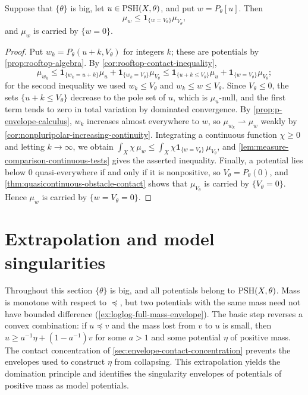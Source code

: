 \begin{proposition}\label{prop:p-envelope-contact-concentration}
Suppose that $\{\theta\}$ is big, let $u\in\mathrm{PSH}(X,\theta)$, and put $w=P_\theta[u]$. Then
\[
 \mu_w\leq\mathbf1_{\{w=V_\theta\}}\mu_{V_\theta},
\]
and $\mu_w$ is carried by $\{w=0\}$.
\end{proposition}
\begin{proof}
Put $w_k=P_\theta(u+k,V_\theta)$ for integers $k$; these are potentials by \cref{prop:rooftop-algebra}. By \cref{cor:rooftop-contact-inequality},
\[
 \mu_{w_k}\leq\mathbf1_{\{w_k=u+k\}}\mu_u+\mathbf1_{\{w_k=V_\theta\}}\mu_{V_\theta}
        \leq\mathbf1_{\{u+k\leq V_\theta\}}\mu_u
        +\mathbf1_{\{w=V_\theta\}}\mu_{V_\theta};
\]
for the second inequality we used $w_k\leq V_\theta$ and $w_k\leq w\leq V_\theta$. Since $V_\theta\leq0$, the sets $\{u+k\leq V_\theta\}$ decrease to the pole set of $u$, which is $\mu_u$-null, and the first term tends to zero in total variation by dominated convergence. By \cref{prop:p-envelope-calculus}, $w_k$ increases almost everywhere to $w$, so $\mu_{w_k}\rightharpoonup\mu_w$ weakly by \cref{cor:nonpluripolar-increasing-continuity}. Integrating a continuous function $\chi\geq0$ and letting $k\to\infty$, we obtain $\int_X\chi\,\mu_w\leq\int_X\chi\mathbf1_{\{w=V_\theta\}}\,\mu_{V_\theta}$, and \cref{lem:measure-comparison-continuous-tests} gives the asserted inequality. Finally, a potential lies below $0$ quasi-everywhere if and only if it is nonpositive, so $V_\theta=P_\theta(0)$, and \cref{thm:quasicontinuous-obstacle-contact} shows that $\mu_{V_\theta}$ is carried by $\{V_\theta=0\}$. Hence $\mu_w$ is carried by $\{w=V_\theta=0\}$.
\end{proof}

\section{Extrapolation and model singularities}
\label{sec:extrapolation-model-singularities}
Throughout this section $\{\theta\}$ is big, and all potentials belong to $\mathrm{PSH}(X,\theta)$. Mass is monotone with respect to $\preceq$, but two potentials with the same mass need not have bounded difference (\cref{ex:loglog-full-mass-envelope}). The basic step reverses a convex combination: if $u\preceq v$ and the mass lost from $v$ to $u$ is small, then $u\geq a^{-1}\eta+(1-a^{-1})v$ for some $a>1$ and some potential $\eta$ of positive mass. The contact concentration of \cref{sec:envelope-contact-concentration} prevents the envelopes used to construct $\eta$ from collapsing. This extrapolation yields the domination principle and identifies the singularity envelopes of potentials of positive mass as model potentials.

